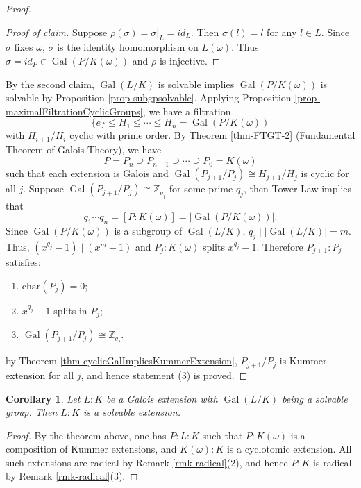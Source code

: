 \documentclass[11pt]{book}
\newtheorem{corollary}[theorem]{Corollary}
\begin{document}
\begin{proof}
\begin{proof}[Proof of claim]
        Suppose $\rho(\sigma)=\sigma|_{L}=id_{L}$. Then $\sigma(l)=l$ for any $l\in L$. Since $\sigma$ fixes $\omega$, $\sigma$ is the identity homomorphism on $L(\omega)$. Thus $\sigma=id_{P}\in \operatorname{Gal}(P /K(\omega))$ and $\rho$ is injective. 
    \end{proof}
    By the second claim, $\operatorname{Gal}(L /K)$ is solvable implies $\operatorname{Gal}(P /K(\omega))$ is solvable by Proposition \ref{prop-subgpsolvable}. Applying Proposition \ref{prop-maximalFiltrationCyclicGroups}, we have a filtration 
    \[
    \{e\}\leq H_{1}\leq \cdots \leq H_{n}=\operatorname{Gal}(P /K(\omega))
    \]
    with $H_{i+1} /H_{i}$ cyclic with prime order. By Theorem \ref{thm-FTGT-2} (Fundamental Theorem of Galois Theory), we have 
    \[
    P=P_{n}\supseteq P_{n-1}\supseteq\cdots\supseteq P_{0}=K(\omega)
    \] 
    such that each extension is Galois and $\operatorname{Gal}(P_{j+1} /P_{j})\cong H_{j+1} /H_{j}$ is cyclic for all $j$. 
    Suppose $\operatorname{Gal}(P_{j+1} /P_{j})\cong \mathbb{Z}_{q_{j}}$ for some prime $q_{j}$, then Tower Law implies that
    \[ 
    q_{1}\cdots q_{n}=[P:K(\omega)]=\left| \operatorname{Gal}(P /K(\omega)) \right| . 
    \]
    Since $\operatorname{Gal}(P /K(\omega))$ is a subgroup of $\operatorname{Gal}(L /K)$, $q_{j} \mid \left| \operatorname{Gal}(L /K) \right| =m$. Thus, $(x^{q_{j}}-1)\mid (x^{m}-1)$ and $P_{j} :K(\omega)$ splits $x^{q_{j}}-1$. Therefore $P_{j+1} :P_{j}$ satisfies: 
    \begin{enumerate}
        \item $\mathrm{char}(P_{j})=0$;
        \item $x^{q_{j}}-1$ splits in $P_{j}$;
        \item $\operatorname{Gal}(P_{j+1} /P_{j})\cong \mathbb{Z}_{q_{j}}$.
    \end{enumerate}
    by Theorem \ref{thm-cyclicGalImpliesKummerExtension}, $P_{j+1} /P_{j}$ is Kummer extension for all $j$, and hence statement (3) is proved.
\end{proof}

\begin{corollary}
    Let $L:K$ be a Galois extension with $\operatorname{Gal}(L/K)$ being a solvable group. Then $L:K$ is a solvable extension.
\end{corollary}
\begin{proof}
    By the theorem above, one has $P:L:K$ such that $P:K(\omega)$ is a composition of Kummer extensions, and $K(\omega):K$ is a cyclotomic extension. All such extensions are radical by Remark \ref{rmk-radical}(2), and hence $P:K$ is radical by Remark \ref{rmk-radical}(3).
\end{proof}
\end{document}
